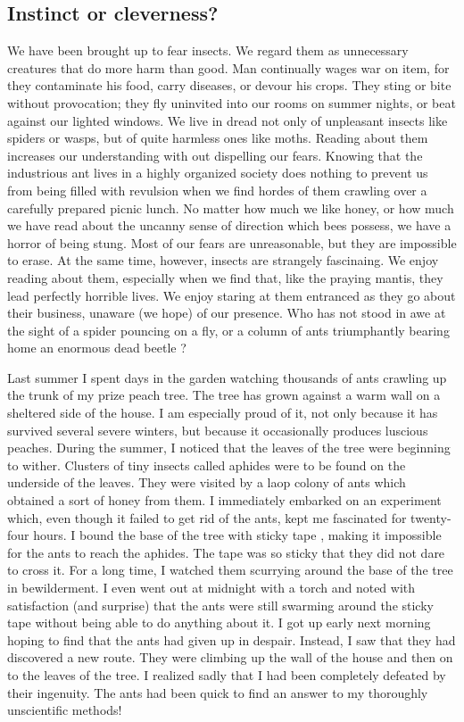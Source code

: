 \documentclass[11pt]{article}
\begin{document}
\subsection{Instinct or cleverness?}
\label{sec-1-54}

We have been brought up to fear insects. We regard them as unnecessary creatures that do more harm than good. Man continually wages war on item, for they contaminate his food, carry diseases, or devour his crops. They sting or bite without provocation; they fly uninvited into our rooms on summer nights, or beat against our lighted windows. We live in dread not only of unpleasant insects like spiders or wasps, but of quite harmless ones like moths. Reading about them increases our understanding with out dispelling our fears. Knowing that the industrious ant lives in a highly organized society does nothing to prevent us from being filled with revulsion when we find hordes of them crawling over a carefully prepared picnic lunch. No matter how much we like honey, or how much we have read about the uncanny sense of direction which bees possess, we have a horror of being stung. Most of our fears are unreasonable, but they are impossible to erase. At the same time, however, insects are strangely fascinaing. We enjoy reading about them, especially when we find that, like the praying mantis, they lead perfectly horrible lives. We enjoy staring at them entranced as they go about their business, unaware (we hope) of our presence. Who has not stood in awe at the sight of a spider pouncing on a fly, or a column of ants triumphantly bearing home an enormous dead beetle ? 

Last summer I spent days in the garden watching thousands of ants crawling up the trunk of my prize peach tree. The tree has grown against a warm wall on a sheltered side of the house. I am especially proud of it, not only because it has survived several severe winters, but because it occasionally produces luscious peaches. During the summer, I noticed that the leaves of the tree were beginning to wither. Clusters of tiny insects called aphides were to be found on the underside of the leaves. They were visited by a laop colony of ants which obtained a sort of honey from them. I immediately embarked on an experiment which, even though it failed to get rid of the ants, kept me fascinated for twenty-four hours. I bound the base of the tree with sticky tape , making it impossible for the ants to reach the aphides. The tape was so sticky that they did not dare to cross it. For a long time, I watched them scurrying around the base of the tree in bewilderment. I even went out at midnight with a torch and noted with satisfaction (and surprise) that the ants were still swarming around the sticky tape without being able to do anything about it. I got up early next morning hoping to find that the ants had given up in despair. Instead, I saw that they had discovered a new route. They were climbing up the wall of the house and then on to the leaves of the tree. I realized sadly that I had been completely defeated by their ingenuity. The ants had been quick to find an answer to my thoroughly unscientific methods!
\end{document}

